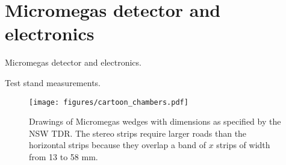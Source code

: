 \section{Micromegas detector and electronics}
\label{sec:experiment}

Micromegas detector and electronics.

Test stand measurements.

\begin{figure}[!htpb]
  \begin{center}
    \texttt{[image: figures/cartoon\_chambers.pdf]}
  \end{center}
  \vspace{-10pt}
  \caption{Drawings of Micromegas wedges with dimensions as specified by the NSW TDR. The stereo strips require larger roads than the horizontal strips because they overlap a band of $x$ strips of width from 13 to 58 mm.}
  \label{fig:chambers}
\end{figure}

